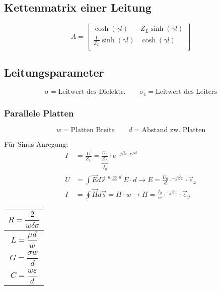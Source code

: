 \subsection{Kettenmatrix einer Leitung}
\[
    A =
    \left[ {\begin{array}{cc}
                    \cosh(\gamma l)               & Z_L \sinh(\gamma l) \\
                    \frac{1}{Z_L} \sinh(\gamma l) & \cosh(\gamma l)     \\
                \end{array} } \right]
\]

\subsection{Leitungsparameter}

{\small\[
        \sigma = \text{Leitwert des Dielektr.} \qquad \sigma_c = \text{Leitwert des Leiters}
    \]}

\subsubsection{Parallele Platten}
{\small\[
        w  = \text{Platten Breite} \qquad d  = \text{Abstand zw. Platten}
    \]}

Für Sinus-Anregung:
\begin{align*}
    I & = \frac{U}{Z_L} = \underbrace{\frac{U_0}{Z_L}}_{I_0}\cdot e^{-j\beta z\cdot e^{j\omega t}}                         \\
    U & = \int \vec{E} d\vec{s} \stackrel{w\gg d}{=} E\cdot d \rightarrow E = \frac{U_0}{d}\cdot^{-j\beta z}\cdot\vec{e}_x \\
    I & = \oint \vec{H} d\vec{s} =  H\cdot w \rightarrow H = \frac{I_0}{w}\cdot^{-j\beta z}\cdot\vec{e}_y                  %
\end{align*}


{\renewcommand*{\arraystretch}{0.2}
    \begin{tabularx}{0.5\columnwidth}{|X|}
        \hline
        \[R=\frac{2}{w\delta\sigma}\] \\
        \hline
        \[L=\frac{\mu d}{w}\]         \\
        \hline
        \[G=\frac{\sigma w}{d}\]      \\
        \hline
        \[C=\frac{w\varepsilon}{d}\]  \\
        \hline
    \end{tabularx}
}

